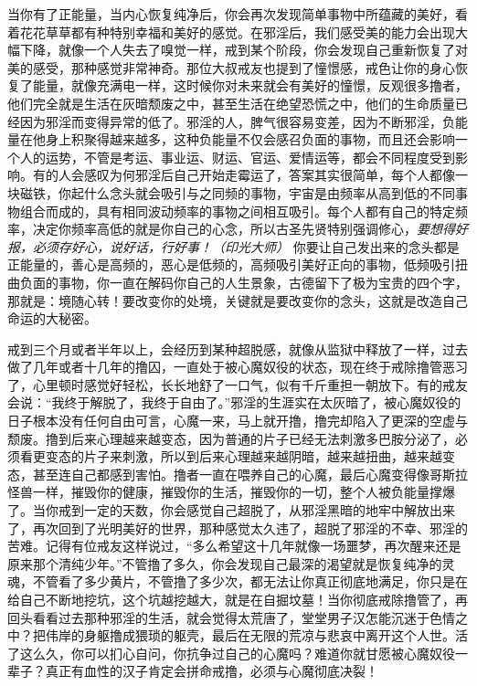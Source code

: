 当你有了正能量，当内心恢复纯净后，你会再次发现简单事物中所蕴藏的美好，看着花花草草都有种特别幸福和美好的感觉。在邪淫后，我们感受美的能力会出现大幅下降，就像一个人失去了嗅觉一样，戒到某个阶段，你会发现自己重新恢复了对美的感受，那种感觉非常神奇。那位大叔戒友也提到了憧憬感，戒色让你的身心恢复了能量，就像充满电一样，这时候你对未来就会有美好的憧憬，反观很多撸者，他们完全就是生活在灰暗颓废之中，甚至生活在绝望恐慌之中，他们的生命质量已经因为邪淫而变得异常的低了。邪淫的人，脾气很容易变差，因为不断邪淫，负能量在他身上积聚得越来越多，这种负能量不仅会感召负面的事物，而且还会影响一个人的运势，不管是考运、事业运、财运、官运、爱情运等，都会不同程度受到影响。有的人会感叹为何邪淫后自己开始走霉运了，答案其实很简单，每个人都像一块磁铁，你起什么念头就会吸引与之同频的事物，宇宙是由频率从高到低的不同事物组合而成的，具有相同波动频率的事物之间相互吸引。每个人都有自己的特定频率，决定你频率高低的就是你自己的心念，所以古圣先贤特别强调修心，\textit{要想得好报，必须存好心，说好话，行好事！（印光大师）} 你要让自己发出来的念头都是正能量的，善心是高频的，恶心是低频的，高频吸引美好正向的事物，低频吸引扭曲负面的事物，你一直在解码你自己的人生景象，古德留下了极为宝贵的四个字，那就是：境随心转！要改变你的处境，关键就是要改变你的念头，这就是改造自己命运的大秘密。

戒到三个月或者半年以上，会经历到某种超脱感，就像从监狱中释放了一样，过去做了几年或者十几年的撸囚，一直处于被心魔奴役的状态，现在终于戒除撸管恶习了，心里顿时感觉好轻松，长长地舒了一口气，似有千斤重担一朝放下。有的戒友会说：“我终于解脱了，我终于自由了。”邪淫的生涯实在太灰暗了，被心魔奴役的日子根本没有任何自由可言，心魔一来，马上就开撸，撸完却陷入了更深的空虚与颓废。撸到后来心理越来越变态，因为普通的片子已经无法刺激多巴胺分泌了，必须看更变态的片子来刺激，所以到后来心理越来越阴暗，越来越扭曲，越来越变态，甚至连自己都感到害怕。撸者一直在喂养自己的心魔，最后心魔变得像哥斯拉怪兽一样，摧毁你的健康，摧毁你的生活，摧毁你的一切，整个人被负能量撑爆了。当你戒到一定的天数，你会感觉自己超脱了，从邪淫黑暗的地牢中解放出来了，再次回到了光明美好的世界，那种感觉太久违了，超脱了邪淫的不幸、邪淫的苦难。记得有位戒友这样说过，“多么希望这十几年就像一场噩梦，再次醒来还是原来那个清纯少年。”不管撸了多久，你会发现自己最深的渴望就是恢复纯净的灵魂，不管看了多少黄片，不管撸了多少次，都无法让你真正彻底地满足，你只是在给自己不断地挖坑，这个坑越挖越大，就是在自掘坟墓！当你彻底戒除撸管了，再回头看看过去那种邪淫的生活，就会觉得太荒唐了，堂堂男子汉怎能沉迷于色情之中？把伟岸的身躯撸成猥琐的躯壳，最后在无限的荒凉与悲哀中离开这个人世。活了这么久，你可以扪心自问，你抗争过自己的心魔吗？难道你就甘愿被心魔奴役一辈子？真正有血性的汉子肯定会拼命戒撸，必须与心魔彻底决裂！

